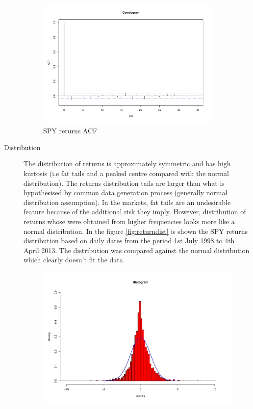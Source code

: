\begin{description}
 \begin{figure}[h]
 \centering
 \includegraphics[width=0.9\textwidth]{plots/spy_returns_acf.pdf}
 \caption{SPY returns ACF}
 \label{fig:returnacf}
\end{figure}
\item[Distribution] The distribution of returns is approximately symmetric and
has high kurtosis (i.e fat tails and a peaked centre compared with the normal
distribution). 
The returns distribution tails are larger than what is hypothesised by common
data generation process (generally normal distribution assumption). In the
markets, fat tails are an undesirable feature because of the additional risk
they imply.  However, distribution of returns whose were obtained from higher
frequencies looks more like a normal distribution.
In the figure \ref{fig:returndist} is shown the SPY returns distribution based
on daily dates from the period 1st July 1998 to 4th April 2013. The distribution
was compared against the normal distribution which clearly doesn't fit the data.  
 \begin{figure}[h]
 \centering
 \includegraphics[scale=0.5]{plots/spy_returns_dist.pdf}

\end{figure}
\end{description}
